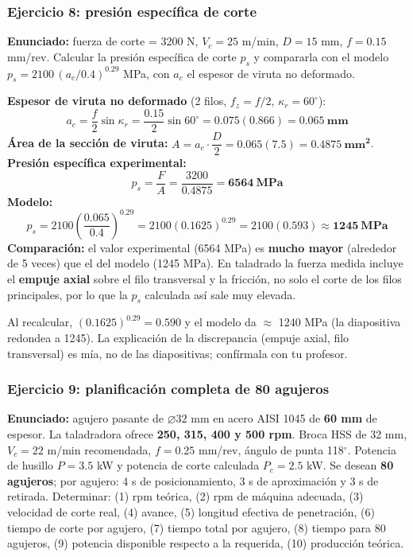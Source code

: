 \documentclass[12pt,a4paper]{article}
\begin{document}
\subsubsection*{Ejercicio 8: presión específica de corte}
\textbf{Enunciado:} fuerza de corte = 3200 N, $V_c = 25$ m/min, $D = 15$ mm, $f
	= 0.15$ mm/rev. Calcular la presión específica de corte $p_s$ y compararla con
el modelo $p_s = 2100\,(a_c/0.4)^{0.29}$ MPa, con $a_c$ el espesor de viruta no
deformado.

\textbf{Espesor de viruta no deformado} (2 filos, $f_z = f/2$, $\kappa_r =
	60^\circ$):
\[ a_c = \frac{f}{2}\sin\kappa_r = \frac{0.15}{2}\sin 60^\circ = 0.075(0.866) =
	\mathbf{0.065\ mm} \]
\textbf{Área de la sección de viruta:} $A = a_c\cdot\dfrac{D}{2} = 0.065(7.5) =
	\mathbf{0.4875\ mm^2}$.\\
\textbf{Presión específica experimental:}
\[ p_s = \frac{F}{A} = \frac{3200}{0.4875} = \mathbf{6564\ MPa} \]
\textbf{Modelo:}
\[ p_s = 2100\left(\frac{0.065}{0.4}\right)^{0.29} = 2100(0.1625)^{0.29} =
	2100(0.593) \approx \mathbf{1245\ MPa} \]
\textbf{Comparación:} el valor experimental (6564 MPa) es \textbf{mucho mayor}
(alrededor de 5 veces) que el del modelo (1245 MPa). En taladrado la fuerza
medida incluye el \textbf{empuje axial} sobre el filo transversal y la fricción,
no solo el corte de los filos principales, por lo que la $p_s$ calculada así
sale muy elevada.

\begin{aviso}
	Al recalcular, $(0.1625)^{0.29} = 0.590$ y el modelo da $\approx$ 1240 MPa (la
	diapositiva redondea a 1245). La explicación de la discrepancia (empuje axial,
	filo transversal) es mía, no de las diapositivas; confírmala con tu profesor.
\end{aviso}

\subsubsection*{Ejercicio 9: planificación completa de 80 agujeros}
\textbf{Enunciado:} agujero pasante de $\varnothing 32$ mm en acero AISI 1045 de
\textbf{60 mm} de espesor. La taladradora ofrece \textbf{250, 315, 400 y 500
	rpm}. Broca HSS de 32 mm, $V_c = 22$ m/min recomendada, $f = 0.25$ mm/rev,
ángulo de punta 118$^\circ$. Potencia de husillo $P = 3.5$ kW y potencia de
corte calculada $P_c = 2.5$ kW. Se desean \textbf{80 agujeros}; por agujero: 4 s
de posicionamiento, 3 s de aproximación y 3 s de retirada. Determinar: (1) rpm
teórica, (2) rpm de máquina adecuada, (3) velocidad de corte real, (4) avance,
(5) longitud efectiva de penetración, (6) tiempo de corte por agujero, (7)
tiempo total por agujero, (8) tiempo para 80 agujeros, (9) potencia disponible
respecto a la requerida, (10) producción teórica.
\end{document}
